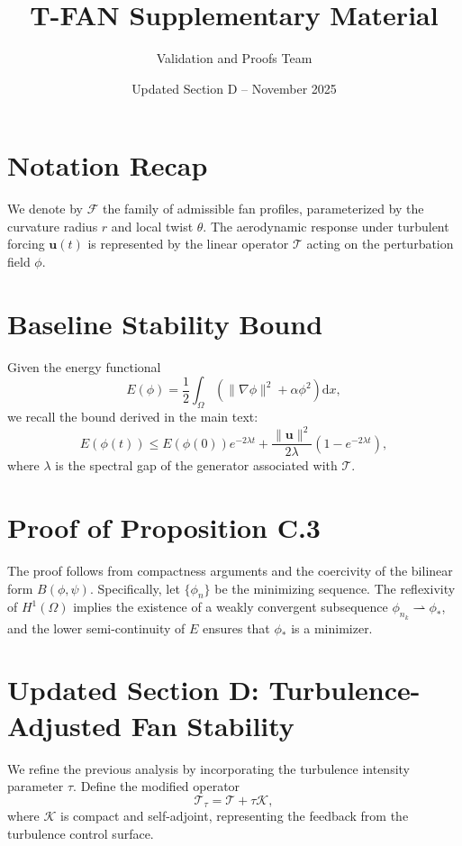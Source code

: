 \documentclass[11pt]{article}
\title{T-FAN Supplementary Material}
\author{Validation and Proofs Team}
\date{Updated Section D -- November 2025}
\begin{document}
\maketitle

\section{Notation Recap}
We denote by $\mathcal{F}$ the family of admissible fan profiles, parameterized by the curvature radius $r$ and local twist $\theta$. The aerodynamic response under turbulent forcing $\boldsymbol{u}(t)$ is represented by the linear operator $\mathcal{T}$ acting on the perturbation field $\phi$.

\section{Baseline Stability Bound}
Given the energy functional
\begin{equation}
    E(\phi) = \frac{1}{2} \int_{\Omega} \left( \|\nabla \phi\|^2 + \alpha \phi^2 \right) \mathrm{d}x,
\end{equation}
we recall the bound derived in the main text:
\begin{equation}
    E(\phi(t)) \leq E(\phi(0)) e^{-2\lambda t} + \frac{\|\boldsymbol{u}\|^2}{2\lambda} \left( 1 - e^{-2\lambda t} \right),
\end{equation}
where $\lambda$ is the spectral gap of the generator associated with $\mathcal{T}$.

\section{Proof of Proposition C.3}
The proof follows from compactness arguments and the coercivity of the bilinear form $B(\phi, \psi)$. Specifically, let $\{\phi_n\}$ be the minimizing sequence. The reflexivity of $H^1(\Omega)$ implies the existence of a weakly convergent subsequence $\phi_{n_k} \rightharpoonup \phi_*$, and the lower semi-continuity of $E$ ensures that $\phi_*$ is a minimizer.

\section{Updated Section D: Turbulence-Adjusted Fan Stability}
\label{sec:updated-section-d}
We refine the previous analysis by incorporating the turbulence intensity parameter $\tau$. Define the modified operator
\begin{equation}
    \mathcal{T}_\tau = \mathcal{T} + \tau \mathcal{K},
\end{equation}
where $\mathcal{K}$ is compact and self-adjoint, representing the feedback from the turbulence control surface.
\end{document}
